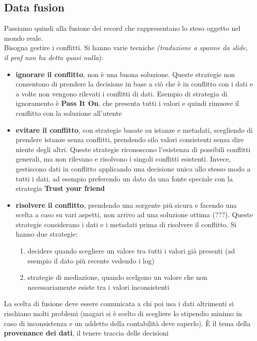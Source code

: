 \documentclass[a4paper,12pt, oneside]{book}
\begin{document}
\subsection{Data fusion}
Passiamo quindi alla fusione dei record che rappresentano lo steso oggetto nel
mondo reale.\\
Bisogna gestire i conflitti. Si hanno varie tecniche \textit{(traduzione a
  spanne da slide, il prof non ha detto quasi nulla}):
\begin{itemize}
  \item \textbf{ignorare il conflitto}, non è una buona soluzione. Queste
  strategie non consentono di prendere la decisione in base a ciò che è in
  conflitto con i dati e a volte non vengono rilevati i conflitti di
  dati. Esempio di strategia di ignoramento è \textbf{Pass It On}, che presenta
  tutti i valori e quindi rimuove il conflitto con la soluzione all'utente 
  \item \textbf{evitare il conflitto}, con strategie basate su istanze e
  metadati, scegliendo di prendere istanze senza conflitti, prendendo silo
  valori consistenti senza dire niente degli altri. Queste strategie
  riconoscono l'esistenza di possibili conflitti generali, ma non rilevano e
  risolvono i singoli conflitti esistenti. Invece, gestiscono dati in conflitto
  applicando una decisione unica allo stesso modo a tutti i dati, ad esempio
  preferendo un dato da una fonte speciale con la strategia \textbf{Trust your
    friend} 
  \item \textbf{risolvere il conflitto}, prendendo una sorgente più sicura e
  facendo una scelta a caso su vari aspetti, non arrivo ad una soluzione ottima
  (???). Queste strategie considerano i dati e i metadati prima di risolvere il
  conflitto. Si hanno due strategie:
  \begin{enumerate}
    \item decidere quando scegliere un valore tra tutti i valori già presenti
    (ad esempio il dato più recente vedendo i log)
    \item strategie di mediazione, quando scelgono un valore che non
    necessariamente esiste tra i valori inconsistenti
  \end{enumerate}
\end{itemize}
La scelta di fusione deve essere comunicata a chi poi usa i dati altrimenti si
rischiano molti problemi (magari si è scelto di scegliere lo stipendio minimo in
caso di inconsistenza e un addetto della contabilità deve saperlo).
È il tema della \textbf{provenance dei dati}, il tenere traccia delle decisioni
\end{document}
